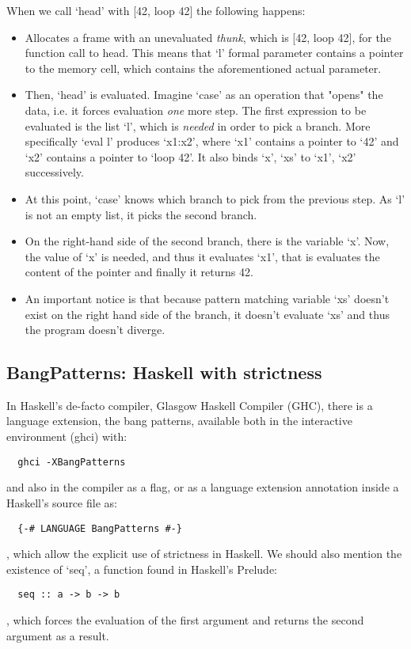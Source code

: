 \documentclass[diploma]{softlab-thesis}
\begin{document}
When we call `head' with [42, loop 42] the following happens:
\begin {itemize}
  \item Allocates a frame with an unevaluated \textit{thunk}, which is [42, loop 42], for the function call to head.
  This means that `l' formal parameter contains a pointer to the memory cell, which contains the aforementioned actual parameter. 
  \item Then, `head' is evaluated. Imagine `case' as an operation that "opens" the data, i.e. it forces evaluation \textit{one} 
  more step. The first expression to be evaluated is the list `l', which is \textit{needed} in order to pick a branch. More 
  specifically `eval l' produces `x1:x2', where `x1' contains a pointer to `42' and `x2' contains a pointer to `loop 42'.
  It also binds `x', `xs' to `x1', `x2' successively.
  \item At this point, `case' knows which branch to pick from the previous step. As `l' is not an empty list, it picks the 
  second branch. 
  \item On the right-hand side of the second branch, there is the variable `x'. Now, the value of `x' is needed, and thus 
  it evaluates `x1', that is evaluates the content of the pointer and finally it returns 42.
  \item An important notice is that because pattern matching variable `xs' doesn't exist on the right hand side 
  of the branch, it doesn't evaluate `xs' and thus the program doesn't diverge.
\end{itemize}

\subsection{BangPatterns: Haskell with strictness}

In Haskell's de-facto compiler, Glasgow Haskell Compiler (GHC), there is a language extension, the bang patterns, 
available both in the interactive environment (ghci) with:
\begin{verbatim}
  ghci -XBangPatterns
\end{verbatim}
and also in the compiler as a flag, or as a language extension annotation inside a Haskell's source file as:
\begin{verbatim}
  {-# LANGUAGE BangPatterns #-}
\end{verbatim}
, which allow the explicit use of strictness in Haskell. We should also mention the existence of `seq', a function found
in Haskell's Prelude:
\begin{verbatim}
  seq :: a -> b -> b
\end{verbatim}
, which forces the evaluation of the first argument and returns the second argument as a result.
\end{document}

